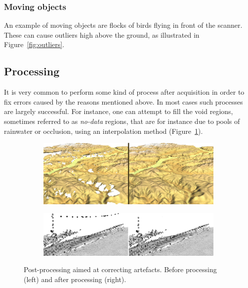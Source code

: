 \subsubsection{Moving objects}
An example of moving objects are flocks of birds flying in front of the scanner. These can cause outliers high above the ground, as illustrated in Figure~\ref{fig:outliers}.


\subsection{Processing}
It is very common to perform some kind of process after acquisition in order to fix errors caused by the reasons mentioned above. 
In most cases such processes are largely successful. 
For instance, one can attempt to fill the void regions, sometimes referred to as \emph{no-data} regions, that are for instance due to pools of rainwater or occlusion, using an interpolation method (Figure~\ref{fig:voidfill}).
\begin{figure}
	\centering
	\begin{subfigure}{0.9\linewidth}
		\includegraphics[width=\textwidth]{figs/srtm_trento_voidfill.png}
		\label{fig:voidfill}
	\end{subfigure}
	
	\begin{subfigure}{0.9\linewidth}
		\includegraphics[width=\textwidth]{figs/ourlier-detection-wrong.png}
		\label{fig:outlier-wrong}
	\end{subfigure}
	\caption{Post-processing aimed at correcting artefacts. Before processing (left) and after processing (right).}
	\label{fig:processing}
\end{figure}
